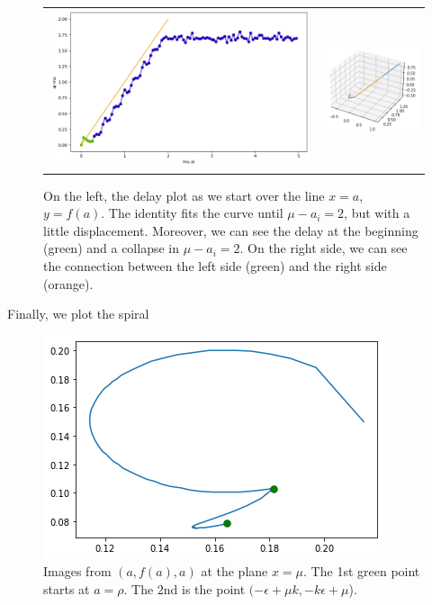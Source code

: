 \documentclass[a4paper,preprint,11pt]{article}
\begin{document}
\begin{figure}[h]
\begin{tabular}{cc}
\includegraphics[scale=0.34]{Slow_Passage/SPplot_keqm.png} &
\includegraphics[scale=0.6]{Slow_Passage/SP3Dline_keqm.png}
\end{tabular}
\caption{On the left, the delay plot as we start over the line $x=a$, $y=f(a)$. The identity fits the curve until $\mu-a_i=2$, but with a little displacement. Moreover, we can see the delay at the beginning (green) and a collapse in $\mu-a_i=2$. On the right side, we can see the connection between the left side (green) and the right side (orange).}
\label{fig:SP3D.keqm}
\end{figure}

Finally, we plot the spiral

\begin{figure}[h]
    \centering
    \includegraphics[scale=0.6]{Slow_Passage/Spiral_keqm.png}
    \caption{Images from $(a,f(a),a)$ at the plane $x=\mu$. The 1st green point starts at $a=\rho$. The 2nd is the point $(-\epsilon+\mu k, -k\epsilon+\mu$).}
    \label{fig:spiral.keqm}
\end{figure}
\end{document}
